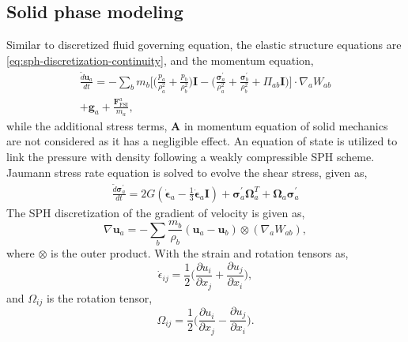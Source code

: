 \documentclass[10pt, conference]{FMFP2022}
\newcommand{\teng}[1]{\ensuremath{\boldsymbol{#1}}}
\newcommand{\ten}[1]{\ensuremath{\mathbf{#1}}}
\begin{document}
\subsection{\textbf{Solid phase modeling}}\label{subsec:solid}
Similar to discretized fluid governing equation, the elastic structure equations are
\eqref{eq:sph-discretization-continuity}, and the momentum equation,
\begin{multline}
  \label{eq:sph-momentum-solid}
  \frac{\tilde{d}\ten{u}_{a}}{dt} = - \sum_{b} m_b \bigg[
  \bigg(\frac{p_a}{\rho_a^2} + \frac{p_b}{\rho_b^2}\bigg) \ten{I} -
  \bigg(\frac{\teng{\sigma}^{'}_{a}}{\rho_a^2} +
  \frac{\teng{\sigma}^{'}_{b}}{\rho_b^2} + \Pi_{ab} \ten{I} \bigg) \bigg]  \cdot \nabla_{a} W_{ab} \\
  + \ten{g}_{a} + \frac{\ten{F}^a_{\text{FSI}}}{m_a},
\end{multline}
while the additional stress terms, $\ten{A}$ in momentum equation of solid
mechanics are not considered as it has a negligible effect. An equation of state
is utilized to link the pressure with density following a weakly compressible
SPH scheme. Jaumann stress rate equation is solved to evolve the shear stress,
given as,
\begin{multline}
  \label{eq:sph-modified-jaumann-stress}
  \frac{\tilde{d}\teng{\sigma}^{'}_{a}}{dt} = 2G (\dot{\teng{\epsilon}}_{a} -
  \frac{1}{3} \dot{\teng{\epsilon}}_{a} \ten{I}) + \teng{\sigma}^{'}_{a}
  \teng{\Omega}_{a}^{T} +
  \teng{\Omega}_{a} \teng{\sigma}^{'}_{a}
\end{multline}
The SPH discretization of the
gradient of velocity is given as,
\begin{equation}
  \label{eq:sph-vel-grad}
  \nabla \ten{u}_a =
  - \sum_{b} \frac{m_b}{\rho_{b}} (\ten{u}_{a} - \ten{u}_{b}) \otimes (\nabla_{a} W_{ab}),
\end{equation}
where $\otimes$ is the outer product. With the strain and rotation tensors as,
\begin{equation}
  \label{eq:strain-tensor}
  \dot{\epsilon}_{ij} = \frac{1}{2} \bigg(\frac{\partial u_i}{\partial x_j} +
  \frac{\partial u_j}{\partial x_i} \bigg),
\end{equation}
and $\Omega_{ij}$ is the rotation tensor,
\begin{equation}
  \label{eq:rotational-tensor}
  \Omega_{ij} = \frac{1}{2} \bigg(\frac{\partial u_i}{\partial x_j} -
  \frac{\partial u_j}{\partial x_i} \bigg).
\end{equation}
\end{document}
